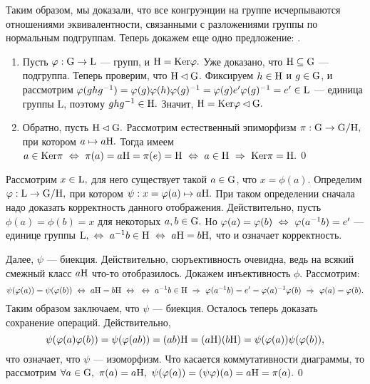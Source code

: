 Таким образом, мы доказали, что все конгруэнции на группе исчерпываются отношениями эквивалентности, связанными с разложениями группы по нормальным подгруппам. Теперь
докажем еще одно предложение:
.
\par\dok \begin{enumerate}
    \item Пусть $\varphi : {\rm G}\rightarrow{\rm L}$ --- \г групп, и ${\rm H}={\rm Ker}\varphi.$ Уже доказано, что ${\rm H}\subseteq{\rm G}$ --- подгруппа. Теперь проверим, что
    ${\rm H}\lhd{\rm G}$. Фиксируем $h\in{\rm H}$ и $g\in{\rm G}$, и рассмотрим $\varphi(ghg^{-1})=\varphi(g)\varphi(h)\varphi(g)^{-1}=\varphi(g)e'\varphi(g)^{-1}=e'\in{\rm L}$ --- единица группы \rr L, поэтому
    $ghg^{-1}\in{\rm H}.$ Значит, ${\rm H}={\rm Ker}\varphi\lhd{\rm G}.$
    \item Обратно, пусть ${\rm H}\lhd{\rm G}.$ Рассмотрим естественный эпиморфизм $\pi : {\rm G}\rightarrow {\rm G}/{\rm H}, $ при котором $a\mapsto a{\rm H}.$
    Тогда имеем $a\in{\rm Ker}\pi\ \Leftrightarrow\ \pi(a)=a{\rm H}=\pi(e)={\rm H}\ \Leftrightarrow\  a\in{\rm H}\ \Rightarrow\ {\rm Ker}\pi={\rm H}.$\qquad\qed
\end{enumerate}

\dok Рассмотрим $x\in{\rm L},$ для него существует такой $a\in{\rm G}$, что $x=\phi(a).$ Определим $\varphi : {\rm L}\rightarrow {\rm G}/{\rm H},$ при котором $\psi : x=\varphi(a)\mapsto a{\rm H}.$
При таком определении сначала надо доказать корректность данного отображения. Действительно, пусть $\phi(a)=\phi(b)=x$ для некоторых $a,b\in{\rm G}.$
Но $\varphi(a)=\varphi(b)\ \Leftrightarrow\ \varphi(a^{-1}b)=e'$ --- единице группы ${\rm L},\ \Leftrightarrow\  a^{-1}b\in{\rm H}\ \Leftrightarrow\  a{\rm H}=b{\rm H},$ что и означает корректность.

Далее, $\psi$ --- биекция. Действительно, сюръективность очевидна, ведь на всякий смежный класс $a{\rm H}$ что-то отобразилось. Докажем инъективность $\phi$.
Рассмотрим: $$\psi(\varphi(a))=\psi(\varphi(b))\ \Leftrightarrow\  a{\rm H}=b{\rm H}\ \Leftrightarrow\ \\\ \Leftrightarrow\  a^{-1}b\in{\rm H}\ \Rightarrow\ \varphi(a^{-1}b)=e'=\varphi(a)^{-1}\varphi(b)\ \Rightarrow\  \varphi(a)=\varphi(b).$$
Таким образом заключаем, что $\psi$ --- биекция. Осталось теперь доказать сохранение операций. Действительно, $$\psi(\varphi(a)\varphi(b))=\psi(\varphi(ab))=(ab){\rm H}=(a{\rm H})(b{\rm H})=\psi(\varphi(a))\psi(\varphi(b)),$$
что означает, что $\psi$ --- изоморфизм. Что касается коммутативности диаграммы, то рассмотрим $\forall a\in\rr G,\ \pi(a)=a\rr H,\ \psi(\phi(a))=(\psi\phi)(a)=a\rr H=\pi(a).$\qquad\qed

